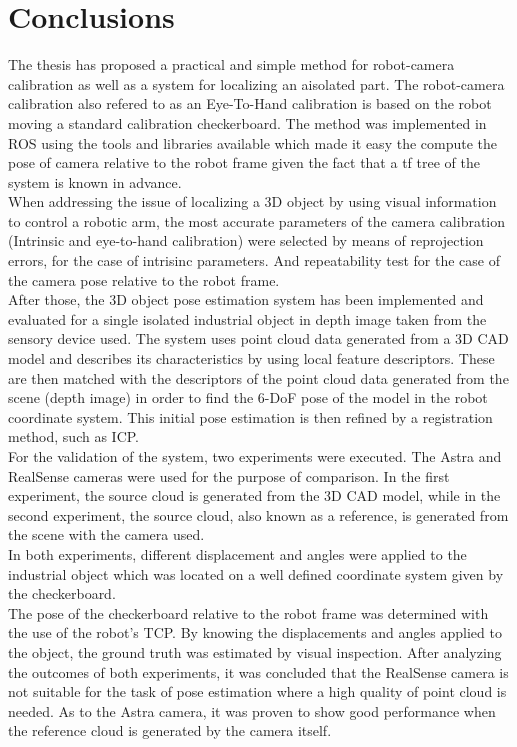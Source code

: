 \chapter{Conclusions}
\label{chap:con}


The thesis has proposed a practical and simple method for robot-camera calibration as well as a system for localizing an aisolated part. The robot-camera calibration also refered to as an Eye-To-Hand calibration is based on the robot moving a standard calibration checkerboard. The method was implemented in ROS using the tools and libraries available which made it easy the compute the pose of camera relative to the robot frame given the fact that a tf tree of the system is known in advance. \\
When addressing the issue of localizing a 3D object by using visual information to control a robotic arm, the most accurate parameters of the camera calibration (Intrinsic and eye-to-hand calibration)  were selected by means of reprojection errors, for the case of intrisinc parameters. And repeatability test for the case of the camera pose relative to the robot frame. \\
After those, the 3D object pose estimation system has been implemented and evaluated for a single isolated industrial object in depth image taken from the sensory device used. The system uses point cloud data generated from a 3D CAD model and describes its characteristics by using local feature descriptors. These are then matched with the descriptors of the point cloud data generated from the scene (depth image) in order to find the 6-DoF pose of the model in the robot coordinate system. This initial pose estimation is then refined by a registration method, such as ICP.\\
For the validation of the system, two experiments were executed. The Astra and RealSense cameras were used for the purpose of comparison. In the first experiment,  the source cloud is generated from the 3D CAD model, while in the second experiment, the source cloud, also known as a reference, is generated from the scene with the camera used.\\ 
In both experiments, different displacement and angles were applied to the industrial object which was located on a well defined coordinate system given by the checkerboard. \\
The pose of the checkerboard relative to the robot frame was determined with the use of the robot's TCP. By knowing the displacements and angles applied to the object, the ground truth was estimated by visual inspection.  After analyzing the outcomes of both experiments, it was concluded that the RealSense camera is not suitable for the task of pose estimation where a high quality of point cloud is needed. As to the Astra camera, it was proven to show good performance when the reference cloud is generated by the camera itself. \\


